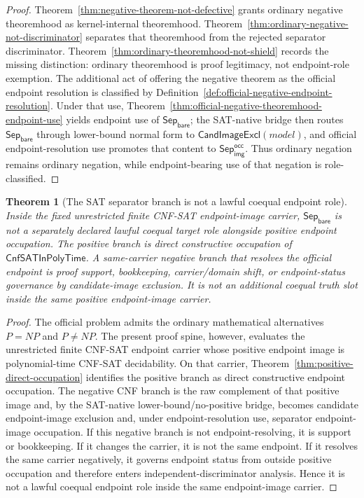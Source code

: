\documentclass[11pt]{article}
\newtheorem{theorem}{Theorem}[section]
\theoremstyle{definition}
\theoremstyle{remark}
\newcommand{\SepBare}{\mathsf{Sep}_{\mathsf{bare}}}
\newcommand{\SepImgOcc}{\mathsf{Sep}_{\mathsf{img}}^{\mathsf{occ}}}
\newcommand{\CnfSATP}{\mathsf{CnfSATInPolyTime}}
\newcommand{\CandImageExcl}{\mathsf{CandImageExcl}}
\begin{document}
\begin{proof}
Theorem~\ref{thm:negative-theorem-not-defective} grants ordinary negative theoremhood as kernel-internal theoremhood. Theorem~\ref{thm:ordinary-negative-not-discriminator} separates that theoremhood from the rejected separator discriminator. Theorem~\ref{thm:ordinary-theoremhood-not-shield} records the missing distinction: ordinary theoremhood is proof legitimacy, not endpoint-role exemption. The additional act of offering the negative theorem as the official endpoint resolution is classified by Definition~\ref{def:official-negative-endpoint-resolution}. Under that use, Theorem~\ref{thm:official-negative-theoremhood-endpoint-use} yields endpoint use of \(\SepBare\); the SAT-native bridge then routes \(\SepBare\) through lower-bound normal form to \(\CandImageExcl(model)\), and official endpoint-resolution use promotes that content to \(\SepImgOcc\). Thus ordinary negation remains ordinary negation, while endpoint-bearing use of that negation is role-classified.
\end{proof}

\begin{theorem}[The SAT separator branch is not a lawful coequal endpoint role]\label{thm:separator-not-lawful-coequal-role}
Inside the fixed unrestricted finite CNF-SAT endpoint-image carrier, \(\SepBare\) is not a separately declared lawful coequal target role alongside positive endpoint occupation. The positive branch is direct constructive occupation of \(\CnfSATP\). A same-carrier negative branch that resolves the official endpoint is proof support, bookkeeping, carrier/domain shift, or endpoint-status governance by candidate-image exclusion. It is not an additional coequal truth slot inside the same positive endpoint-image carrier.
\end{theorem}

\begin{proof}
The official problem admits the ordinary mathematical alternatives \(P=NP\) and \(P\ne NP\). The present proof spine, however, evaluates the unrestricted finite CNF-SAT endpoint carrier whose positive endpoint image is polynomial-time CNF-SAT decidability. On that carrier, Theorem~\ref{thm:positive-direct-occupation} identifies the positive branch as direct constructive endpoint occupation. The negative CNF branch is the raw complement of that positive image and, by the SAT-native lower-bound/no-positive bridge, becomes candidate endpoint-image exclusion and, under endpoint-resolution use, separator endpoint-image occupation. If this negative branch is not endpoint-resolving, it is support or bookkeeping. If it changes the carrier, it is not the same endpoint. If it resolves the same carrier negatively, it governs endpoint status from outside positive occupation and therefore enters independent-discriminator analysis. Hence it is not a lawful coequal endpoint role inside the same endpoint-image carrier.
\end{proof}
\end{document}
